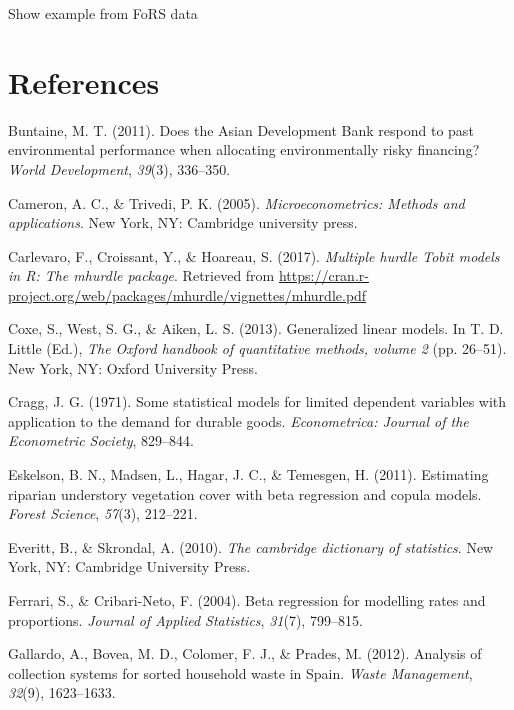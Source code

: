 \documentclass[english,man]{apa6}
\theoremstyle{definition}
\theoremstyle{definition}
\theoremstyle{remark}
\begin{document}
Show example from FoRS data

\newpage

\section{References}\label{references}

\setlength{\parindent}{-0.5in} \setlength{\leftskip}{0.5in}

\hypertarget{refs}{}
\hypertarget{ref-buntaine2011does}{}
Buntaine, M. T. (2011). Does the Asian Development Bank respond to past
environmental performance when allocating environmentally risky
financing? \emph{World Development}, \emph{39}(3), 336--350.

\hypertarget{ref-cameron2005microeconometrics}{}
Cameron, A. C., \& Trivedi, P. K. (2005). \emph{Microeconometrics:
Methods and applications}. New York, NY: Cambridge university press.

\hypertarget{ref-carlevaro2016multiple}{}
Carlevaro, F., Croissant, Y., \& Hoareau, S. (2017). \emph{Multiple
hurdle Tobit models in R: The mhurdle package}. Retrieved from
\url{https://cran.r-project.org/web/packages/mhurdle/vignettes/mhurdle.pdf}

\hypertarget{ref-coxe2013generalized}{}
Coxe, S., West, S. G., \& Aiken, L. S. (2013). Generalized linear
models. In T. D. Little (Ed.), \emph{The Oxford handbook of quantitative
methods, volume 2} (pp. 26--51). New York, NY: Oxford University Press.

\hypertarget{ref-cragg1971some}{}
Cragg, J. G. (1971). Some statistical models for limited dependent
variables with application to the demand for durable goods.
\emph{Econometrica: Journal of the Econometric Society}, 829--844.

\hypertarget{ref-eskelson2011estimating}{}
Eskelson, B. N., Madsen, L., Hagar, J. C., \& Temesgen, H. (2011).
Estimating riparian understory vegetation cover with beta regression and
copula models. \emph{Forest Science}, \emph{57}(3), 212--221.

\hypertarget{ref-everitt2002cambridge}{}
Everitt, B., \& Skrondal, A. (2010). \emph{The cambridge dictionary of
statistics}. New York, NY: Cambridge University Press.

\hypertarget{ref-ferrari2004beta}{}
Ferrari, S., \& Cribari-Neto, F. (2004). Beta regression for modelling
rates and proportions. \emph{Journal of Applied Statistics},
\emph{31}(7), 799--815.

\hypertarget{ref-gallardo2012analysis}{}
Gallardo, A., Bovea, M. D., Colomer, F. J., \& Prades, M. (2012).
Analysis of collection systems for sorted household waste in Spain.
\emph{Waste Management}, \emph{32}(9), 1623--1633.
\end{document}
